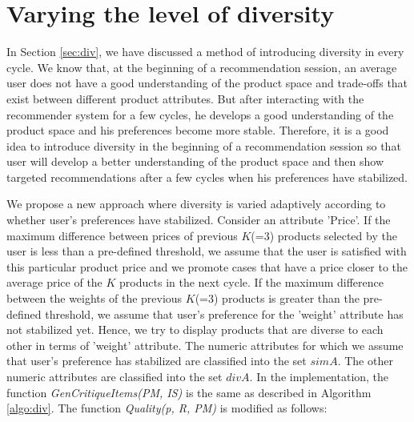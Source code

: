 \section{Varying the level of diversity}
In Section \ref{sec:div}, we have discussed a method of introducing diversity in every cycle.
We know that, at the beginning of a recommendation session, an average user does not have a good understanding of the product space and trade-offs that exist between different product attributes.
But after interacting with the recommender system for a few cycles, he develops a good understanding of the product space and his preferences become more stable.
Therefore, it is a good idea to introduce diversity in the beginning of a recommendation session so that user will develop a better understanding of the product space and then show targeted recommendations after a few cycles when his preferences have stabilized.

We propose a new approach where diversity is varied adaptively according to whether user's preferences have stabilized.
Consider an attribute 'Price'.
If the maximum difference between prices of previous $K$(=3) products selected by the user is less than a pre-defined threshold, we assume that the user is satisfied with this particular product price and we promote cases that have a price closer to the average price of the $K$ products in the next cycle.
If the maximum difference between the weights of the previous $K$(=3) products is greater than the pre-defined threshold, we assume that user's preference for the 'weight' attribute has not stabilized yet. 
Hence, we try to display products that are diverse to each other in terms of 'weight' attribute.
The numeric attributes for which we assume that user's preference has stabilized are classified into the set $simA$.
The other numeric attributes are classified into the set $divA$.
In the implementation, the function \textit{GenCritiqueItems(PM, IS)} is the same as described in Algorithm \ref{algo:div}.
The function \textit{Quality(p, R, PM)} is modified as follows:

